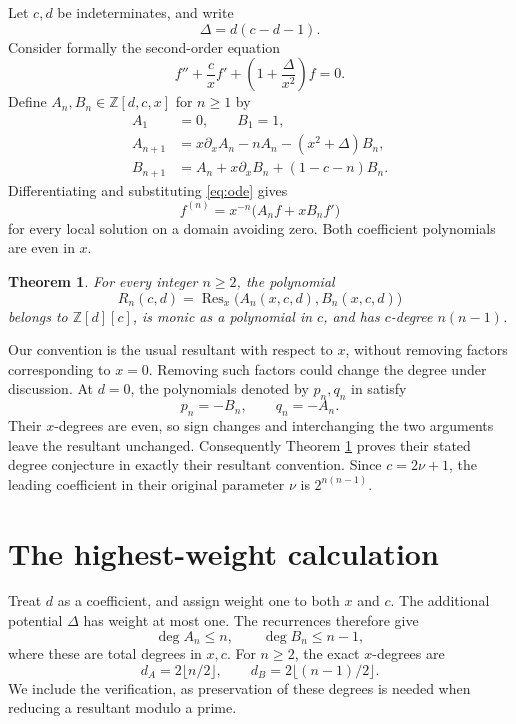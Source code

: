 \documentclass[11pt]{article}
\newtheorem{theorem}{Theorem}[section]
\DeclareMathOperator{\Res}{Res}
\newcommand{\Z}{\mathbb Z}
\begin{document}
Let $c,d$ be indeterminates, and write
\[
 \Delta=d(c-d-1).
\]
Consider formally the second-order equation
\begin{equation}\label{eq:ode}
 f''+\frac c x f'+\left(1+\frac{\Delta}{x^2}\right)f=0.
\end{equation}
Define $A_n,B_n\in\Z[d,c,x]$ for $n\ge1$ by
\begin{equation}\label{eq:recurrence}
\begin{split}
 A_1&=0,\qquad B_1=1,\\
 A_{n+1}&=x\partial_xA_n-nA_n-(x^2+\Delta)B_n,\\
 B_{n+1}&=A_n+x\partial_xB_n+(1-c-n)B_n.
\end{split}
\end{equation}
Differentiating and substituting \eqref{eq:ode} gives
\begin{equation}\label{eq:derivative}
 f^{(n)}=x^{-n}\bigl(A_nf+xB_nf'\bigr)
\end{equation}
for every local solution on a domain avoiding zero. Both coefficient
polynomials are even in $x$.

\begin{theorem}\label{thm:main}
For every integer $n\ge2$, the polynomial
\[
 R_n(c,d)=\Res_x\bigl(A_n(x,c,d),B_n(x,c,d)\bigr)
\]
belongs to $\Z[d][c]$, is monic as a polynomial in $c$, and has
$c$-degree $n(n-1)$.
\end{theorem}

Our convention is the usual resultant with respect to $x$, without
removing factors corresponding to $x=0$. Removing such factors could
change the degree under discussion. At $d=0$, the polynomials denoted
by $p_n,q_n$ in \cite{LM95} satisfy
\[
 p_n=-B_n,\qquad q_n=-A_n.
\]
Their $x$-degrees are even, so sign changes and interchanging the two
arguments leave the resultant unchanged. Consequently Theorem
\ref{thm:main} proves their stated degree conjecture in exactly their
resultant convention. Since $c=2\nu+1$, the leading coefficient in
their original parameter $\nu$ is $2^{n(n-1)}$.

\section{The highest-weight calculation}

Treat $d$ as a coefficient, and assign weight one to both $x$ and $c$.
The additional potential $\Delta$ has weight at most one. The recurrences
therefore give
\[
 \deg A_n\le n,\qquad \deg B_n\le n-1,
\]
where these are total degrees in $x,c$. For $n\ge2$, the exact
$x$-degrees are
\begin{equation}\label{eq:x-degrees}
 d_A=2\lfloor n/2\rfloor,\qquad
 d_B=2\lfloor(n-1)/2\rfloor.
\end{equation}
We include the verification, as preservation of these degrees is needed
when reducing a resultant modulo a prime.
\end{document}

